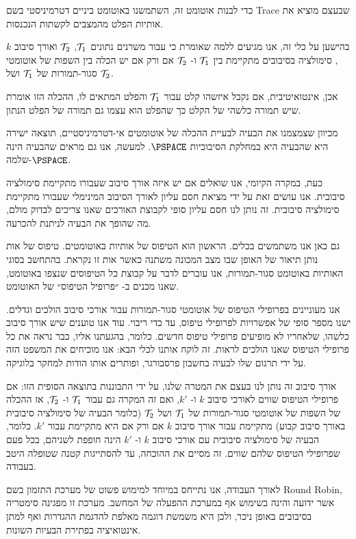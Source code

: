 {כדי לבנות אוטומט זה, השתמשנו באוטומט ביניים דטרמיניסטי בשם
\textenglish{Trace}
שבעצם מוציא את אותיות הפלט מהמצבים לקשתות הנכנסות.

בהישען על כלי זה, אנו מגיעים ללמה שאומרת כי עבור משרנים נתונים
$\mathcal{T}_1$, $\mathcal{T}_2$
ואורך סיבוב
$k$,
 סימולציה בסיבובים מתקיימת בין
$\mathcal{T}_1$
ו-
$\mathcal{T}_2$
אם ורק אם יש הכלה בין השפות של אוטומטי סגור-תמורות של
$\mathcal{T}_1$
ושל
$\mathcal{T}_2$.

אכן, אינטואיטיבית, אם נקבל איזשהו קלט עבור
$\mathcal{T}_1$
והפלט המתאים לו, ההכלה הזו אומרת שיש תמורה כלשהי של הקלט כך שהפלט הוא עצמו גם תמורה של הפלט הנתון.

מכיוון שצמצמנו את הבעיה לבעיית ההכלה של אוטומטים אי-דטרמיניסטיים, תוצאה ישירה היא שהבעיה היא במחלקת הסיבוכיות
$\PSPACE$.
 למעשה, אנו גם מראים שהבעיה הינה
$\PSPACE$-שלמה.

כעת, במקרה הקיומי, אנו שואלים אם יש איזה אורך סיבוב שעבורו מתקיימת סימולציה סיבובית. אנו עושים זאת על ידי מציאת חסם עליון לאורך הסיבוב המינימלי שעבורו מתקיימת סימולציה סיבובית. זה נותן לנו חסם עליון סופי לקבוצת האורכים שאנו צריכים לבדוק מולם, מה שהופך את הבעיה לניתנת להכרעה.

גם כאן אנו משתמשים בכלים. הראשון הוא הטיפוס של אותיות באוטומטים. טיפוס של אות נותן תיאור של האופן שבו מצב המכונה משתנה כאשר אות זו נקראת. בהתחשב בסוגי האותיות באוטומט סגור-תמורות, אנו עוברים לדבר על קבוצת כל הטיפוסים שנצפו באוטומט, שאנו מכנים ב- ״פרופיל הטיפוס״ של האוטומט.

אנו מעוניינים בפרופילי הטיפוס של אוטומטי סגור-תמורות עבור אורכי סיבוב הולכים וגדלים. ישנו מספר סופי של אפשרויות לפרופילי טיפוס, עד כדי ריבוי. עוד אנו טוענים שיש אורך סיבוב כלשהו, שלאחריו לא מופיעים פרופילי טיפוס חדשים. כלומר, בהגעתנו אליו, כבר נראה את כל פרופילי הטיפוס שאנו הולכים לראות. זה לוקח אותנו לכלי הבא: אנו מוכיחים את המשפט הזה על ידי תרגום שלו לבעיה בחשבון פרסבורגר, ופותרים אותו הודות למחקר בלוגיקה.

אורך סיבוב זה נותן לנו בעצם את המטרה שלנו, על ידי התבוננות בתוצאה הסופית הזו: אם פרופילי הטיפוס שווים לאורכי סיבוב
$k$
ו-
$k'$,
 ואם זה המקרה גם עבור
$\mathcal{T}_1$
ו-
$\mathcal{T}_2$,
אז ההכלה של השפות של אוטומטי סגור-תמורות של
$\mathcal{T}_1$
ושל
$\mathcal{T}_2$
(כלומר הבעיה של סימולציה סיבובית באורך סיבוב קבוע) מתקיימת עבור אורך סיבוב
$k$
אם ורק אם היא מתקיימת עבור
$k'$.
 כלומר, הבעיה של סימולציה סיבובית עם אורכי סיבוב
$k$
ו-
$k'$
הינה חופפת לשניהם, בכל פעם שפרופילי הטיפוס שלהם שווים. זה מסיים את ההוכחה, עד להסתייגות קטנה שטופלה היטב בעבודה.

לאורך העבודה, אנו נתייחס במיוחד למימוש פשוט של מערכת התזמון בשם 
\textenglish{Round Robin},
אשר ידועה והינה בשימוש אף במערכת ההפעלה של המחשב. מערכת זו מפגינה סימטריה בסיבובים באופן ניכר, ולכן היא משמשת דוגמה מאלפת להדגמת ההגדרות ואף למתן אינטואיציה בפתירת הבעיות השונות.

}
